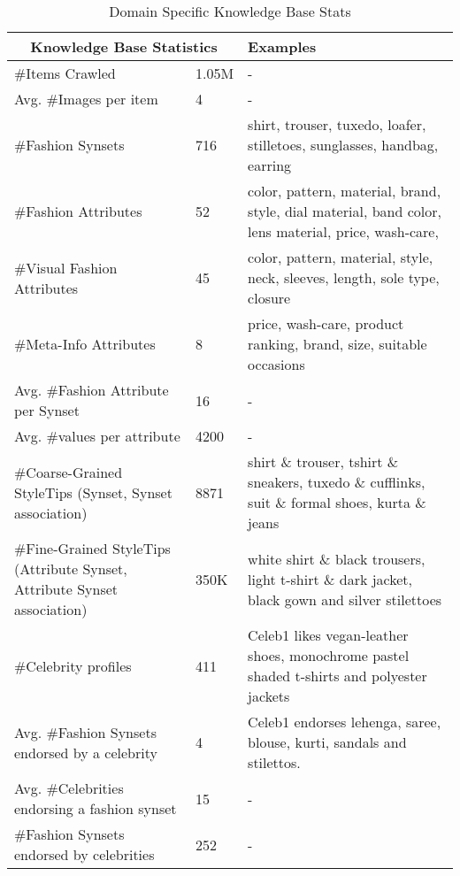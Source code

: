 \documentclass[10pt,a4paper]{article}
\begin{document}
\begin{table}
{\normalsize
\begin{center}
\begin{tabular}{|p{5.5cm}|p{2.4cm}|p{12.5cm}|} \hline
\multicolumn{2}{|c|}{\textbf{Knowledge Base Statistics}} & \textbf{Examples} \\ \hline
\#Items Crawled & 1.05M & -\\\hline
Avg. \#Images per item & 4 & -\\\hline
\#Fashion Synsets& 716 & shirt, trouser, tuxedo, loafer, stilletoes, sunglasses, handbag, earring \\\hline
\#Fashion Attributes & 52 & color, pattern, material, brand, style, dial material, band color, lens material, price, wash-care, \\\hline
\#Visual Fashion Attributes & 45 & color, pattern, material, style, neck, sleeves, length, sole type, closure \\\hline
\#Meta-Info Attributes & 8 & price, wash-care, product ranking, brand, size, suitable occasions \\\hline
Avg. \#Fashion Attribute per Synset & 16 & -\\\hline
Avg. \#values per attribute & 4200 & - \\\hline
\#Coarse-Grained StyleTips (Synset, Synset association)& 8871 & shirt \& trouser, tshirt \& sneakers, tuxedo \& cufflinks, suit \& formal shoes, kurta \& jeans\\\hline
\#Fine-Grained StyleTips (Attribute Synset, Attribute Synset association) & 350K & white shirt \& black trousers, light t-shirt \& dark jacket, black gown and silver stilettoes \\ \hline
\#Celebrity profiles & 411 & Celeb1 likes vegan-leather shoes, monochrome pastel shaded t-shirts and polyester jackets \\ \hline
Avg. \#Fashion Synsets endorsed by a celebrity & 4 & Celeb1 endorses lehenga, saree, blouse, kurti, sandals and stilettos. \\ \hline
Avg. \#Celebrities endorsing a fashion synset & 15 & - \\ \hline
\#Fashion Synsets endorsed by celebrities & 252 & -\\ \hline
\end{tabular}
\end{center}
}
\caption{Domain Specific Knowledge Base Stats}
\label{tab:knowledge_stats}
\end{table}
\end{document}
